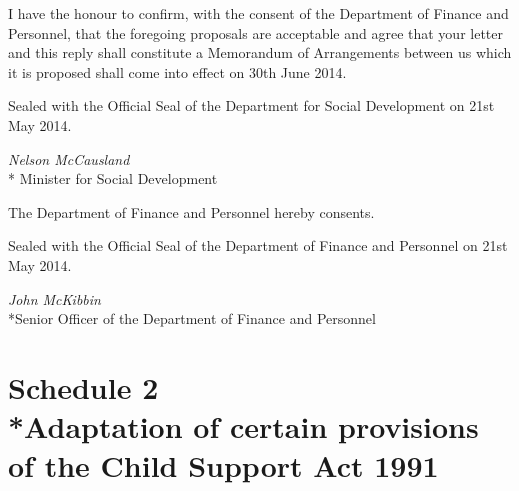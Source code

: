 \documentclass[12pt,a4paper]{article}
\begin{document}
I have the honour to confirm, with the consent of the Department of Finance and
Personnel, that the foregoing proposals are acceptable and agree that your letter and this
reply shall constitute a Memorandum of Arrangements between us which it is proposed
shall come into effect on 30th June 2014.

\bigskip

\pagebreak[3]

Sealed with the Official Seal of the Department for Social Development on 21st May 2014.

{\raggedleft
\emph{Nelson McCausland}\\*
Minister for Social Development

}

\bigskip

\pagebreak[3]

The Department of Finance and Personnel hereby consents.

Sealed with the Official Seal of the Department of Finance and Personnel on 21st May 2014.

{\raggedleft
\emph{John McKibbin}\\*Senior Officer of the Department of Finance and Personnel

}

\vfill

\part[Schedule 2 --- Adaptation of certain provisions of the Child Support Act 1991]{Schedule 2\\*Adaptation of certain provisions of the Child Support Act 1991}

\renewcommand\parthead{--- Schedule 2}
\end{document}
